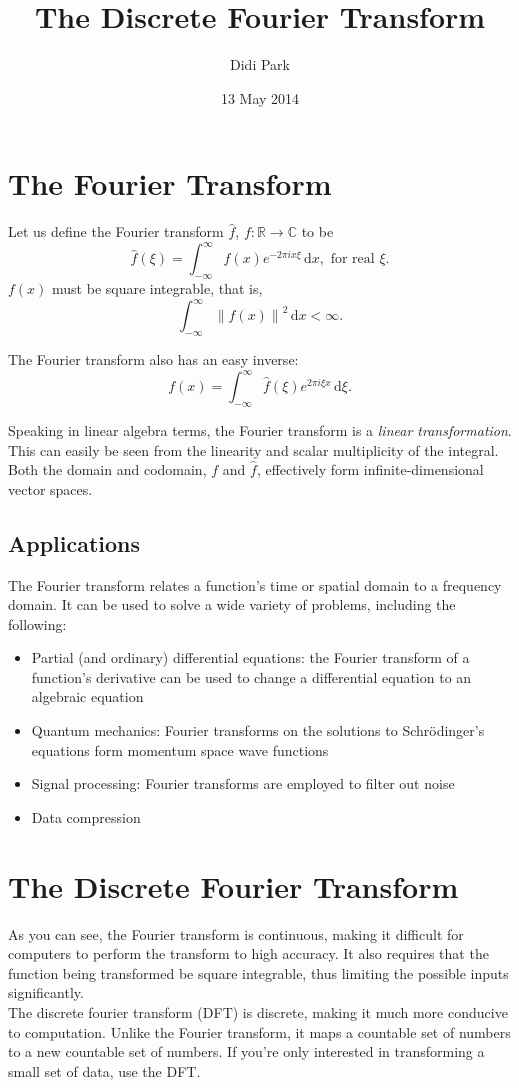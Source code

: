 \documentclass[11pt]{article}
\title{The Discrete Fourier Transform}
\author{Didi Park}
\date{13 May 2014}
\begin{document}
\maketitle

\section{The Fourier Transform}
Let us define the Fourier transform $\hat{f}$, $f: \mathbb{R}\rightarrow\mathbb{C}$ to be
$$\hat{f}(\xi)=\int_{-\infty}^{\infty}f(x)e^{-2\pi i x \xi}\, \mathrm{d}x, \textrm{ for real }\xi.$$
$f(x)$ must be square integrable, that is,
$$\int_{-\infty}^{\infty} {\| f(x) \|}^2\,  \mathrm{d}x <\infty.$$

The Fourier transform also has an easy inverse:
$$f(x)=\int_{-\infty}^{\infty} \hat{f}(\xi)e^{2\pi i \xi x}\, \mathrm{d}\xi.$$

Speaking in linear algebra terms, the Fourier transform is a \emph{linear transformation}. This can easily be seen from the linearity and scalar multiplicity of the integral. Both the domain and codomain, $f$ and $\hat{f}$, effectively form infinite-dimensional vector spaces.
\subsection{Applications}
The Fourier transform relates a function's time or spatial domain to a frequency domain. 
It can be used to solve a wide variety of problems, including the following:
\begin{itemize}
\item Partial (and ordinary) differential equations: the Fourier transform of a function's derivative can be used to change a differential equation to an algebraic equation
\item Quantum mechanics: Fourier transforms on the solutions to Schr\"{o}dinger's equations form momentum space wave functions
\item Signal processing: Fourier transforms are employed to filter out noise
\item Data compression
\end{itemize}

\section{The Discrete Fourier Transform}
As you can see, the Fourier transform is continuous, making it difficult for computers to perform the transform to high accuracy. It also requires that the function being transformed be square integrable, thus limiting the possible inputs significantly.\\
The discrete fourier transform (DFT) is discrete, making it much more conducive to computation. Unlike the Fourier transform, it maps a countable set of numbers to a new countable set of numbers. If you're only interested in transforming a small set of data, use the DFT.
\end{document}
